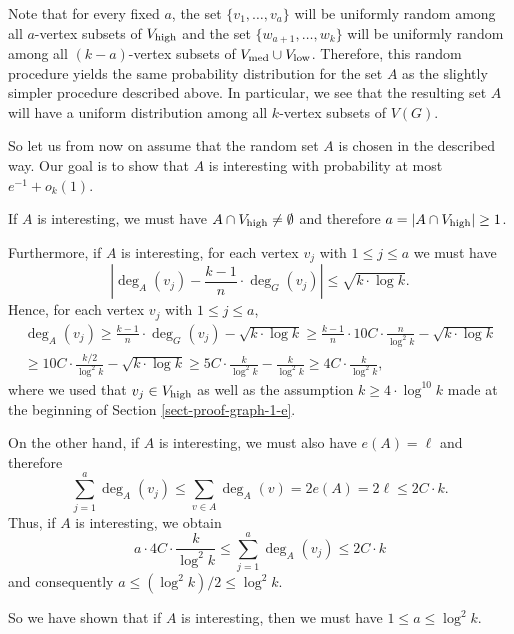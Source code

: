 Note that for every fixed $a$, the set $\lbrace v_1,\dots,v_a\rbrace$ will be uniformly random among all $a$-vertex subsets of $V_{\textnormal{high}}$ and the set $\lbrace w_{a+1},\dots,w_k\rbrace$ will be uniformly random among all $(k-a)$-vertex subsets of $V_{\textnormal{med}}\cup V_{\textnormal{low}}$. Therefore, this random procedure yields the same probability distribution for the set $A$ as the slightly simpler procedure described above. In particular, we see that the resulting set $A$ will have a uniform distribution among all $k$-vertex subsets of $V(G)$.

So let us from now on assume that the random set $A$ is chosen in the described way. Our goal is to show that $A$ is interesting with probability at most $e^{-1}+o_k(1)$.

If $A$ is interesting, we must have $A\cap V_{\textnormal{high}}\neq\emptyset$ and therefore $a=\vert A\cap V_{\textnormal{high}}\vert\geq 1$.

Furthermore, if $A$ is interesting, for each vertex $v_j$ with $1\leq j\leq a$ we must have
\begin{equation}\label{ineq-v-j-A-int}
\left\vert\deg_A(v_j)-\frac{k-1}{n}\cdot \deg_G(v_j)\right\vert\leq  \sqrt{k\cdot \log k}.
\end{equation}
Hence, for each vertex $v_j$ with $1\leq j\leq a$,
\begin{multline*}
\deg_A(v_j)\geq \frac{k-1}{n}\cdot \deg_G(v_j)- \sqrt{k\cdot \log k}\geq 
\frac{k-1}{n}\cdot 10C\cdot \frac{n}{\log^2 k}- \sqrt{k\cdot \log k}\\
\geq 10C\cdot \frac{k/2}{\log^2 k}- \sqrt{k\cdot \log k}\geq 5C\cdot \frac{k}{\log^2 k}- \frac{k}{\log^2 k}\geq 4C\cdot \frac{k}{\log^2 k},
\end{multline*}
where we used that $v_j\in V_{\textnormal{high}}$ as well as the assumption $k\geq 4\cdot \log^{10} k$ made at the beginning of Section \ref{sect-proof-graph-1-e}.

On the other hand, if $A$ is interesting, we must also have $e(A)=\ell$ and therefore
\[\sum_{j=1}^{a}\deg_A(v_j)\leq \sum_{v\in A}\deg_A(v)=2e(A)=2\ell\leq 2C\cdot k.\]
Thus, if $A$ is interesting, we obtain
\[a\cdot 4C\cdot \frac{k}{\log^2 k}\leq \sum_{j=1}^{a}\deg_A(v_j)\leq 2C\cdot k\]
and consequently $a\leq (\log^2 k)/2\leq \log^2 k$.

So we have shown that if $A$ is interesting, then we must have $1\leq a\leq \log^2 k$.

